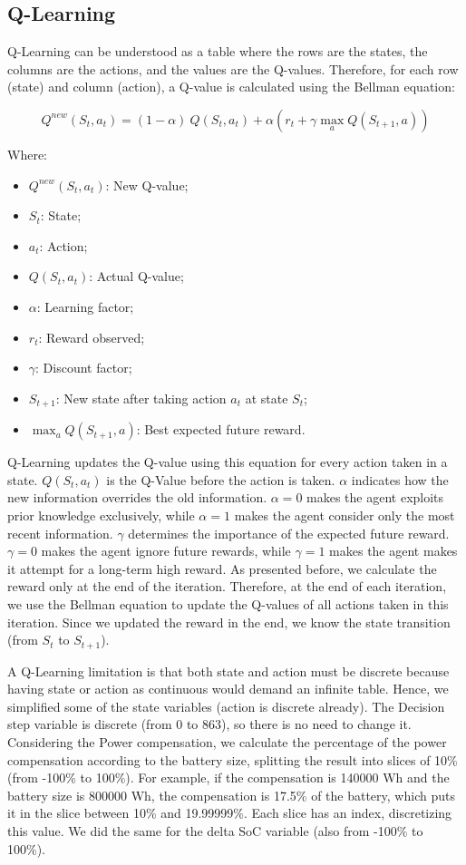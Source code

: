 \subsection{Q-Learning}
Q-Learning can be understood as a table where the rows are the states, the columns are the actions, and the values are the Q-values. Therefore, for each row (state) and column (action), a Q-value is calculated using the Bellman equation:

\begin{equation}
    Q^{new}(S_t, a_t) = (1 - \alpha)\ Q(S_t, a_t) + \alpha (r_t + \gamma \max_a Q(S_{t+1}, a) )
\end{equation}

Where:
\begin{itemize}
    \item $Q^{new}(S_t, a_t)$: New Q-value;
    \item $S_t$: State;
    \item $a_t$: Action;
    \item $Q(S_t, a_t)$: Actual Q-value;
    \item $\alpha$: Learning factor;
    \item $r_t$: Reward observed;
    \item $\gamma$: Discount factor;
    \item $S_{t+1}$: New state after taking action $a_t$ at state $S_t$;
    \item $\max_a Q(S_{t+1}, a)$: Best expected future reward.
\end{itemize}

Q-Learning updates the Q-value using this equation for every action taken in a state. $Q(S_t, a_t)$ is the Q-Value before the action is taken. $\alpha$ indicates how the new information overrides the old information. $\alpha = 0$ makes the agent exploits prior knowledge exclusively, while $\alpha = 1$ makes the agent consider only the most recent information. $\gamma$ determines the importance of the expected future reward. $\gamma = 0$ makes the agent ignore future rewards, while $\gamma = 1$ makes the agent makes it attempt for a long-term high reward. As presented before, we calculate the reward only at the end of the iteration. Therefore, at the end of each iteration, we use the Bellman equation to update the Q-values of all actions taken in this iteration. Since we updated the reward in the end, we know the state transition (from $S_{t}$ to $S_{t+1}$).

A Q-Learning limitation is that both state and action must be discrete because having state or action as continuous would demand an infinite table. Hence, we simplified some of the state variables (action is discrete already). The Decision step variable is discrete (from 0 to 863), so there is no need to change it. Considering the Power compensation, we calculate the percentage of the power compensation according to the battery size, splitting the result into slices of 10\% (from -100\% to 100\%). For example, if the compensation is 140000 Wh and the battery size is 800000 Wh, the compensation is 17.5\% of the battery, which puts it in the slice between 10\% and 19.99999\%. Each slice has an index, discretizing this value. We did the same for the delta SoC variable (also from -100\% to 100\%).

